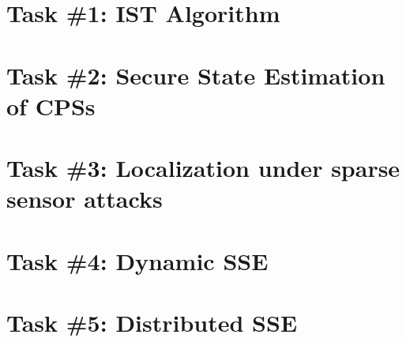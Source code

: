 \section*{Task \#1: IST Algorithm}

    \section*{Task \#2: Secure State Estimation of CPSs}

    \section*{Task \#3: Localization under sparse sensor attacks}

    \section*{Task \#4: Dynamic SSE}

    \section*{Task \#5: Distributed SSE}